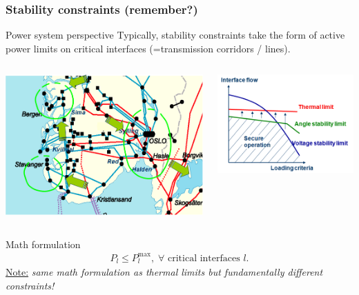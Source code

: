 \documentclass{beamer}
\begin{document}
\begin{frame}
\frametitle{Stability constraints (remember?)}
\begin{block}{Power system perspective}
Typically, stability constraints take the form of active power limits on critical interfaces (=transmission corridors / lines). 

\begin{columns}
\begin{column}{0.3\textwidth}
\includegraphics[width=1\textwidth]{Figs/Hasle.png}    
\end{column}
\begin{column}{0.3\textwidth}
\includegraphics[width=1\textwidth]{Figs/SecurityLimits.png}
\end{column}
\end{columns}  
\end{block}
\begin{block}{Math formulation}
  \begin{align*}
    P_l \leq P_l^{\text{max}}, \; \forall \text{ critical interfaces } l.
  \end{align*}
\underline{Note:} \emph{same math formulation as thermal limits but fundamentally different constraints!}
\end{block}
\end{frame}
\end{document}
